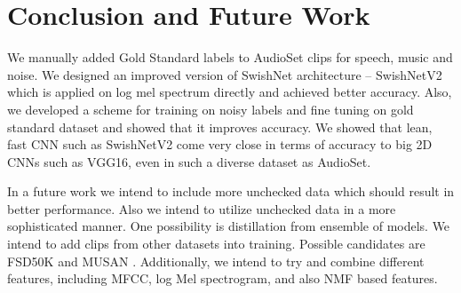 \documentclass{article}
\begin{document}
\section{Conclusion and Future Work}
We manually added Gold Standard labels to AudioSet clips for speech, music and noise. We designed an improved version of SwishNet architecture – SwishNetV2 which is applied on log mel spectrum directly and achieved better accuracy. Also, we developed a scheme for training on noisy labels and fine tuning on gold standard dataset and showed that it improves accuracy. We showed that lean, fast CNN such as SwishNetV2 come very close in terms of accuracy to big 2D CNNs such as VGG16, even in such a diverse dataset as AudioSet.

In a future work we intend to include more unchecked data which should result in better performance. Also we intend to utilize unchecked data in a more sophisticated manner. One possibility is distillation from ensemble of models. We intend to add clips from other datasets into training. Possible candidates are FSD50K \cite{fonseca2020fsd50k} and MUSAN \cite{Snyder2015}. Additionally, we intend to try and combine different features, including MFCC, log Mel spectrogram, and also NMF based features.



\printbibliography
\end{document}
